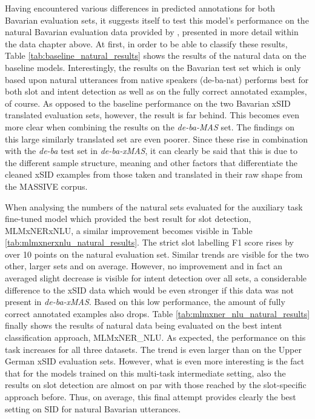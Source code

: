 \documentclass[11pt,a4paper,twoside,openright]{scrbook}
\begin{document}
Having encountered various differences in predicted annotations for both Bavarian evaluation sets, it suggests itself to test this model's performance on the natural Bavarian evaluation data provided by \citet{winkler-etal-2024-slot-intent}, presented in more detail within the data chapter above. At first, in order to be able to classify these results, Table \ref{tab:baseline_natural_results} shows the results of the natural data on the baseline models. Interestingly, the results on the Bavarian test set which is only based upon natural utterances from native speakers (de-ba-nat) performs best for both slot and intent detection as well as on the fully correct annotated examples, of course. As opposed to the baseline performance on the two Bavarian xSID translated evaluation sets, however, the result is far behind. This becomes even more clear when combining the results on the \textit{de-ba-MAS} set. The findings on this large similarly translated set are even poorer. Since these rise in combination with the \textit{de-ba} test set in \textit{de-ba-xMAS}, it can clearly be said that this is due to the different sample structure, meaning and other factors that differentiate the cleaned xSID examples from those taken and translated in their raw shape from the MASSIVE corpus.

When analysing the numbers of the natural sets evaluated for the auxiliary task fine-tuned model which provided the best result for slot detection, MLMxNERxNLU, a similar improvement becomes visible in Table \ref{tab:mlmxnerxnlu_natural_results}. The strict slot labelling F1 score rises by over 10 points on the natural evaluation set. Similar trends are visible for the two other, larger sets and on average. However, no improvement and in fact an averaged slight decrease is visible for intent detection over all sets, a considerable difference to the xSID data which would be even stronger if this data was not present in \textit{de-ba-xMAS}. Based on this low performance, the amount of fully correct annotated examples also drops. 
Table \ref{tab:mlmxner_nlu_natural_results} finally shows the results of natural data being evaluated on the best intent classification approach, MLMxNER\_NLU. As expected, the performance on this task increases for all three datasets. The trend is even larger than on the Upper German xSID evaluation sets. However, what is even more interesting is the fact that for the models trained on this multi-task intermediate setting, also the results on slot detection are almost on par with those reached by the slot-specific approach before. Thus, on average, this final attempt provides clearly the best setting on SID for natural Bavarian utterances.
\end{document}
